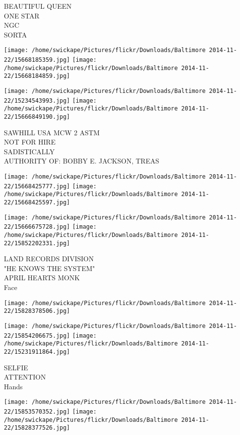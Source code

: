 \documentclass[10pt,letterpaper]{article}
\begin{document}
BEAUTIFUL QUEEN\\
ONE STAR\\
NGC\\
SORTA\\
\pagebreak

\texttt{[image: /home/swickape/Pictures/flickr/Downloads/Baltimore 2014-11-22/15668185359.jpg]}
\texttt{[image: /home/swickape/Pictures/flickr/Downloads/Baltimore 2014-11-22/15668184859.jpg]}

\texttt{[image: /home/swickape/Pictures/flickr/Downloads/Baltimore 2014-11-22/15234543993.jpg]}
\texttt{[image: /home/swickape/Pictures/flickr/Downloads/Baltimore 2014-11-22/15666849190.jpg]}

SAWHILL USA MCW 2 ASTM\\
NOT FOR HIRE\\
SADISTICALLY\\
AUTHORITY OF: BOBBY E. JACKSON, TREAS\\
\pagebreak

\texttt{[image: /home/swickape/Pictures/flickr/Downloads/Baltimore 2014-11-22/15668425777.jpg]}
\texttt{[image: /home/swickape/Pictures/flickr/Downloads/Baltimore 2014-11-22/15668425597.jpg]}

\texttt{[image: /home/swickape/Pictures/flickr/Downloads/Baltimore 2014-11-22/15666675728.jpg]}
\texttt{[image: /home/swickape/Pictures/flickr/Downloads/Baltimore 2014-11-22/15852202331.jpg]}

LAND RECORDS DIVISION\\
"HE KNOWS THE SYSTEM"\\
APRIL HEARTS MONK\\
Face\\
\pagebreak

\texttt{[image: /home/swickape/Pictures/flickr/Downloads/Baltimore 2014-11-22/15828378506.jpg]}

\vspace{0.25in}
\texttt{[image: /home/swickape/Pictures/flickr/Downloads/Baltimore 2014-11-22/15854206675.jpg]}
\texttt{[image: /home/swickape/Pictures/flickr/Downloads/Baltimore 2014-11-22/15231911864.jpg]}

SELFIE\\
ATTENTION\\
Hands\\
\pagebreak

\texttt{[image: /home/swickape/Pictures/flickr/Downloads/Baltimore 2014-11-22/15853570352.jpg]}
\texttt{[image: /home/swickape/Pictures/flickr/Downloads/Baltimore 2014-11-22/15828377526.jpg]}
\end{document}

